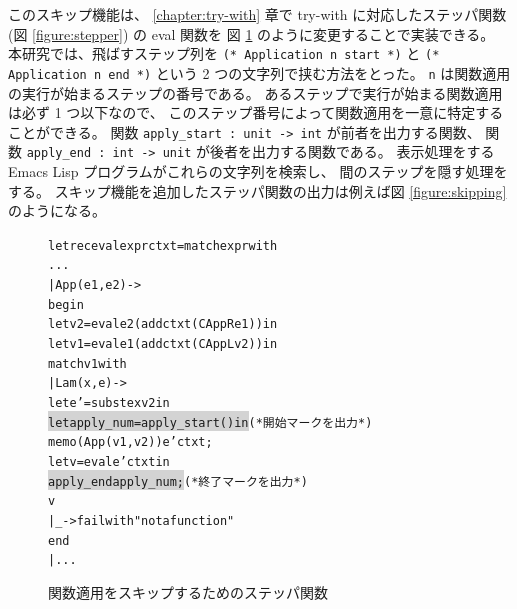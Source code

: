 このスキップ機能は、
\ref{chapter:try-with} 章で try-with に対応したステッパ関数
(図 \ref{figure:stepper}) の eval 関数を
図 \ref{figure:skipapp} のように変更することで実装できる。
本研究では、飛ばすステップ列を
\texttt{(* Application n start *)} と \texttt{(* Application n end *)}
という 2 つの文字列で挟む方法をとった。
\texttt{n} は関数適用の実行が始まるステップの番号である。
あるステップで実行が始まる関数適用は必ず 1 つ以下なので、
このステップ番号によって関数適用を一意に特定することができる。
関数 \texttt{apply\_start :\ unit -> int} が前者を出力する関数、
関数 \texttt{apply\_end :\ int -> unit} が後者を出力する関数である。
表示処理をする Emacs Lisp プログラムがこれらの文字列を検索し、
間のステップを隠す処理をする。
スキップ機能を追加したステッパ関数の出力は例えば図 \ref{figure:skipping} のようになる。

\begin{figure}
\begin{alltt}
let rec eval expr ctxt = match expr with
    ...
  | App (e1, e2) ->
    begin
      let v2 = eval e2 (add ctxt (CAppR e1)) in
      let v1 = eval e1 (add ctxt (CAppL v2)) in
      match v1 with
        | Lam (x, e) ->
          let e' = subst e x v2 in
          \colorbox{lightgray}{let apply_num = apply_start () in}               (* 開始マークを出力 *)
          memo (App (v1, v2)) e' ctxt;
          let v = eval e' ctxt in
          \colorbox{lightgray}{apply_end apply_num;}                            (* 終了マークを出力 *)
          v
        | _ -> failwith "not a function"
    end
  | ...
\end{alltt}
\caption{関数適用をスキップするためのステッパ関数}
\label{figure:skipapp}
\end{figure}

